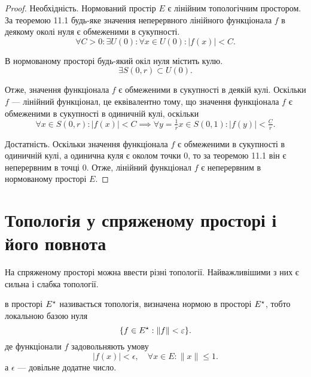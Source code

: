 \begin{proof}
Необхідність. Нормований простір $E$ є
лінійним топологічним простором. За теоремою 11.1
будь-яке значення неперервного лінійного функціонала $f$ в
деякому околі нуля є обмеженими в сукупності.
\begin{equation*}
    \forall C > 0: \exists U(0): \forall x \in U(0): |f(x)| < C.
\end{equation*}

В нормованому просторі будь-який окіл нуля містить кулю.
\begin{equation*}
    \exists S(0, r) \subset U(0).
\end{equation*}

Отже, значення функціонала $f$ є обмеженими в сукупності в
деякій кулі. Оскільки $f$ --- лінійний функціонал, це
еквівалентно тому, що значення функціонала $f$ є
обмеженими в сукупності в одиничній кулі, оскільки
\begin{equation*}
    \forall x \in S(0, r): |f(x)| < C \implies
    \forall y = \tfrac{1}{r} x \in S(0, 1): |f(y)| < \tfrac{C}{r}.
\end{equation*}

Достатність. Оскільки значення функціонала $f$ є
обмеженими в сукупності в одиничній кулі, а одинична куля
є околом точки $0$, то за теоремою 11.1 він є неперервним в
точці $0$. Отже, лінійний функціонал $f$ є неперервним в
нормованому просторі $E$. 
\end{proof}

\section{Топологія у спряженому просторі і його повнота}

На спряженому просторі можна ввести різні топології.
Найважливішими з них є сильна і слабка топології.

\begin{definition}
 в просторі $E^\star$
називається топологія, визначена нормою в просторі $E^\star$,
тобто локальною базою нуля
\begin{equation*}
    \{f \in E^\star: \|f\| < \varepsilon\}.
\end{equation*}
де функціонали $f$ задовольняють умову
\begin{equation*}
    |f(x)| < \epsilon, \quad \forall x \in E: \|x\| \le 1.
\end{equation*}
а $\epsilon$ --- довільне додатне число.
\end{definition}

